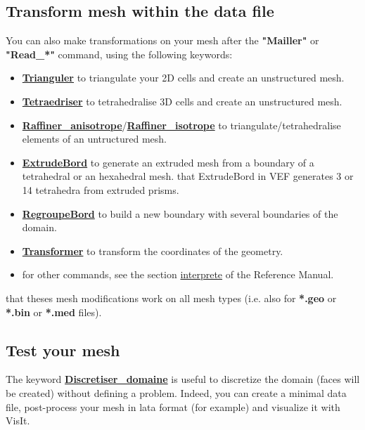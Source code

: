 \subsection{Transform mesh within the data file}
You can also make transformations on your mesh after the \textbf{"Mailler"} or \textbf{"Read\_*"} command, using the following keywords:
\begin{itemize}
\item \href{\REFERENCEMANUAL\#triangulate}{\textbf{Trianguler}} to triangulate your 2D cells and create an unstructured mesh.
\item \href{\REFERENCEMANUAL\#tetraedriser}{\textbf{Tetraedriser}} to tetrahedralise 3D cells and create an unstructured mesh.
\item \href{\REFERENCEMANUAL\#raffineranisotrope}{\textbf{Raffiner\_anisotrope}}/\href{\REFERENCEMANUAL\#raffinerisotrope}{\textbf{Raffiner\_isotrope}} to triangulate/tetrahedralise elements of an untructured mesh.
\item \href{\REFERENCEMANUAL\#extrudebord}{\textbf{ExtrudeBord}} to generate an extruded mesh from a boundary of a tetrahedral or an hexahedral mesh. 
\Note that ExtrudeBord in VEF generates 3 or 14 tetrahedra from extruded prisms.
\item \href{\REFERENCEMANUAL\#regroupebord}{\textbf{RegroupeBord}} to build a new boundary with several boundaries of the domain.
\item \href{\REFERENCEMANUAL\#transformer}{\textbf{Transformer}} to transform the coordinates of the geometry.
\item for other commands, see the section \href{\REFERENCEMANUAL\#interprete}{interprete} of the \trustref Reference Manual.
\end{itemize}

\Note that theses mesh modifications work on all mesh types (i.e. also for \textbf{*.geo} or \textbf{*.bin} or \textbf{*.med} files).



\subsection{Test your mesh}
The keyword \href{\REFERENCEMANUAL\#discretiserdomaine}{\textbf{Discretiser\_domaine}} is useful to discretize the domain (faces will be created) without defining a problem.
Indeed, you can create a minimal data file, post-process your mesh in lata format (for example) and visualize it with VisIt. \\

